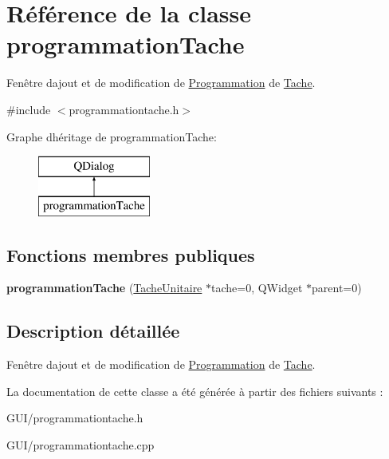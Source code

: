\hypertarget{classprogrammation_tache}{}\section{Référence de la classe programmation\+Tache}
\label{classprogrammation_tache}


Fenêtre d\textquotesingle{}ajout et de modification de \hyperlink{class_programmation}{Programmation} de \hyperlink{class_tache}{Tache}.  




{\ttfamily \#include $<$programmationtache.\+h$>$}

Graphe d\textquotesingle{}héritage de programmation\+Tache\+:\begin{figure}[H]
\begin{center}
\leavevmode
\includegraphics[height=2.000000cm]{classprogrammation_tache}
\end{center}
\end{figure}
\subsection*{Fonctions membres publiques}
\begin{DoxyCompactItemize}
\item 
\hypertarget{classprogrammation_tache_a95f013eeff1cffc8ce6b30cc31b8df68}{}{\bfseries programmation\+Tache} (\hyperlink{class_tache_unitaire}{Tache\+Unitaire} $\ast$tache=0, Q\+Widget $\ast$parent=0)\label{classprogrammation_tache_a95f013eeff1cffc8ce6b30cc31b8df68}

\end{DoxyCompactItemize}


\subsection{Description détaillée}
Fenêtre d\textquotesingle{}ajout et de modification de \hyperlink{class_programmation}{Programmation} de \hyperlink{class_tache}{Tache}. 

La documentation de cette classe a été générée à partir des fichiers suivants \+:\begin{DoxyCompactItemize}
\item 
G\+U\+I/programmationtache.\+h\item 
G\+U\+I/programmationtache.\+cpp\end{DoxyCompactItemize}
